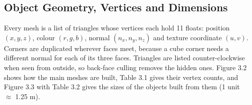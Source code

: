 \documentclass[12pt, a4paper]{report}
\begin{document}
\subsection{Object Geometry, Vertices and Dimensions}

\begin{justify}
  {\fontsize{12}{13.8}\selectfont
    Every mesh is a list of triangles whose vertices each hold 11 floats: position $(x,y,z)$, colour $(r,g,b)$, normal $(n_x,n_y,n_z)$ and texture coordinate $(u,v)$. Corners are duplicated wherever faces meet, because a cube corner needs a different normal for each of its three faces. Triangles are listed counter-clockwise when seen from outside, so back-face culling removes the hidden ones. Figure 3.2 shows how the main meshes are built, Table 3.1 gives their vertex counts, and Figure 3.3 with Table 3.2 gives the sizes of the objects built from them (1 unit $\approx$ 1.25 m).
  }
\end{justify}
\end{document}
